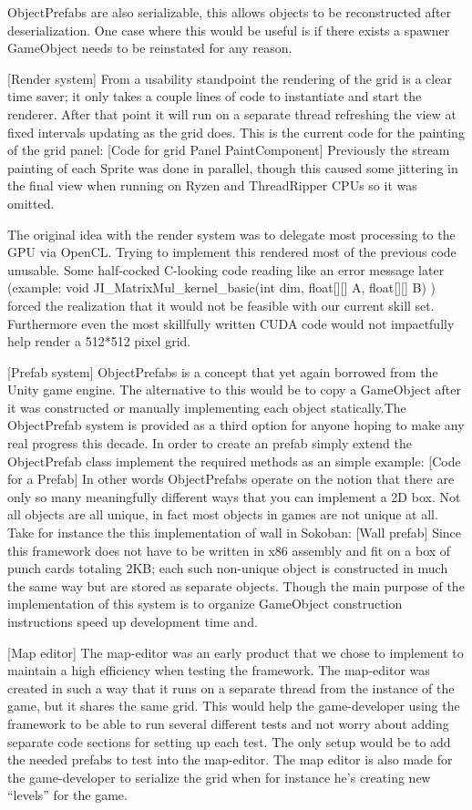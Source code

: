 \documentclass[main.tex]{subfiles}
\begin{document}
ObjectPrefabs are also serializable, this allows objects to be reconstructed after deserialization. One case where this would be useful is if there exists a spawner GameObject needs to be reinstated for any reason. 

[Render system]
From a usability standpoint the rendering of the grid is a clear time saver; it only takes a couple lines of code to instantiate and start the renderer. After that point it will run on a separate thread refreshing the view at fixed intervals updating as the grid does. This is the current code for the painting of the grid panel:
	[Code for grid Panel PaintComponent]
Previously the stream painting of each Sprite was done in parallel, though this caused some jittering in the final view when running on Ryzen and ThreadRipper CPUs so it was omitted.

The original idea with the render system was to delegate most processing to the GPU via OpenCL. Trying to implement this rendered most of the previous code unusable. Some half-cocked C-looking code reading like an error message later (example: void JI\_MatrixMul\_kernel\_basic(int dim, float[][] A, float[][] B){} )  forced the realization that it would not be feasible with our current skill set. Furthermore even the most skillfully written CUDA code would not impactfully help render a 512*512 pixel grid.

[Prefab system]
ObjectPrefabs is a concept that yet again borrowed from the Unity game engine. 
The alternative to this would be to copy a GameObject after it was constructed or manually implementing each object statically.The ObjectPrefab system is provided as a third option for anyone hoping to make any real progress this decade. In order to create an prefab simply extend the ObjectPrefab class implement the required methods as an simple example:
	[Code for a Prefab]
In other words ObjectPrefabs operate on the notion that there are only so many meaningfully different ways that you can implement a 2D box. Not all objects are all unique, in fact most objects in games are not unique at all. Take for instance the this implementation of wall in Sokoban: 
	[Wall prefab]
Since this framework does not have to be written in x86 assembly and fit on a box of punch cards totaling 2KB; each such non-unique object is constructed in much the same way but are stored as separate objects. Though the main purpose of the implementation of this system is to organize GameObject construction instructions speed up development time and.

[Map editor]
The map-editor was an early product that we chose to implement to maintain a high efficiency when testing the framework. The map-editor was created in such a way that it runs on a separate thread from the instance of the game, but it shares the same grid. This would help the game-developer using the framework to be able to run several different tests and not worry about adding separate code sections for setting up each test. The only setup would be to add the needed prefabs to test into the map-editor. The map editor is also made for the game-developer to serialize the grid when for instance he’s creating new “levels” for the game.
\end{document}
